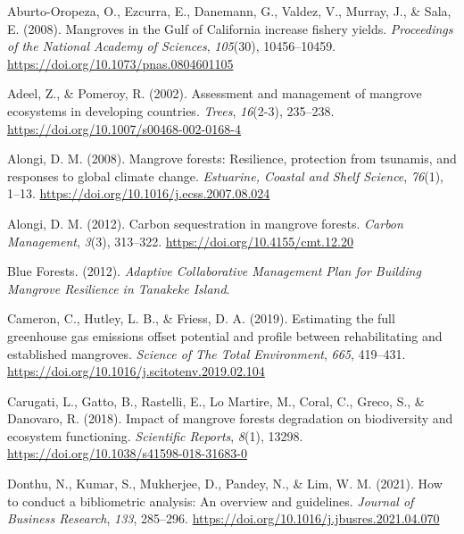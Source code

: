 \documentclass[
  12pt,
]{article}
\newlength{\cslhangindent}
\newlength{\cslentryspacingunit} %
\newenvironment{CSLReferences}[2] %
 {%
  \setlength{\parindent}{0pt}
  \ifodd #1
  \let\oldpar\par
  \def\par{\hangindent=\cslhangindent\oldpar}
  \fi
  \setlength{\parskip}{#2\cslentryspacingunit}
 }%
 {}
\begin{document}
\hypertarget{refs}{}
\begin{CSLReferences}{1}{2}
\leavevmode{}%
Aburto-Oropeza, O., Ezcurra, E., Danemann, G., Valdez, V., Murray, J., \& Sala, E. (2008). Mangroves in the {Gulf} of {California} increase fishery yields. \emph{Proceedings of the National Academy of Sciences}, \emph{105}(30), 10456--10459. \url{https://doi.org/10.1073/pnas.0804601105}

\leavevmode{}%
Adeel, Z., \& Pomeroy, R. (2002). Assessment and management of mangrove ecosystems in developing countries. \emph{Trees}, \emph{16}(2-3), 235--238. \url{https://doi.org/10.1007/s00468-002-0168-4}

\leavevmode{}%
Alongi, D. M. (2008). Mangrove forests: {Resilience}, protection from tsunamis, and responses to global climate change. \emph{Estuarine, Coastal and Shelf Science}, \emph{76}(1), 1--13. \url{https://doi.org/10.1016/j.ecss.2007.08.024}

\leavevmode{}%
Alongi, D. M. (2012). Carbon sequestration in mangrove forests. \emph{Carbon Management}, \emph{3}(3), 313--322. \url{https://doi.org/10.4155/cmt.12.20}

\leavevmode{}%
Blue Forests. (2012). \emph{Adaptive {Collaborative} {Management} {Plan} for {Building} {Mangrove} {Resilience} in {Tanakeke} {Island}}.

\leavevmode{}%
Cameron, C., Hutley, L. B., \& Friess, D. A. (2019). Estimating the full greenhouse gas emissions offset potential and profile between rehabilitating and established mangroves. \emph{Science of The Total Environment}, \emph{665}, 419--431. \url{https://doi.org/10.1016/j.scitotenv.2019.02.104}

\leavevmode{}%
Carugati, L., Gatto, B., Rastelli, E., Lo Martire, M., Coral, C., Greco, S., \& Danovaro, R. (2018). Impact of mangrove forests degradation on biodiversity and ecosystem functioning. \emph{Scientific Reports}, \emph{8}(1), 13298. \url{https://doi.org/10.1038/s41598-018-31683-0}

\leavevmode{}%
Donthu, N., Kumar, S., Mukherjee, D., Pandey, N., \& Lim, W. M. (2021). How to conduct a bibliometric analysis: {An} overview and guidelines. \emph{Journal of Business Research}, \emph{133}, 285--296. \url{https://doi.org/10.1016/j.jbusres.2021.04.070}


\end{CSLReferences}
\end{document}
